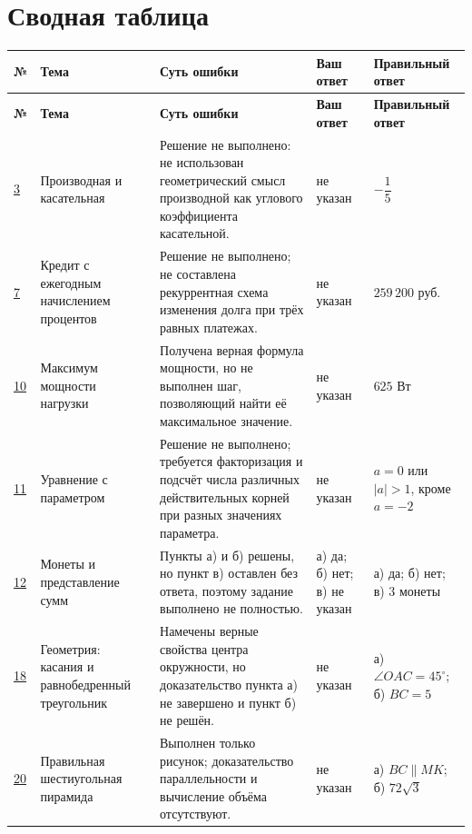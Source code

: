 \documentclass[12pt,a4paper]{article}
\begin{document}
\section*{Сводная таблица}
\small
\setlength{\tabcolsep}{3pt}
\begin{longtable}{>{\centering\arraybackslash}p{0.8cm} p{2.1cm} p{4.5cm} p{2.5cm} p{3.8cm}}
\toprule
\textbf{№} & \textbf{Тема} & \textbf{Суть ошибки} & \textbf{Ваш ответ} & \textbf{Правильный ответ} \\
\midrule
\endfirsthead
\toprule
\textbf{№} & \textbf{Тема} & \textbf{Суть ошибки} & \textbf{Ваш ответ} & \textbf{Правильный ответ} \\
\midrule
\endhead
\bottomrule
\endfoot

\hyperref[task:3]{3} &
Производная и касательная &
Решение не выполнено: не использован геометрический смысл производной как углового коэффициента касательной. &
не указан &
$-\dfrac15$ \\

\hyperref[task:7]{7} &
Кредит с ежегодным начислением процентов &
Решение не выполнено; не составлена рекуррентная схема изменения долга при трёх равных платежах. &
не указан &
$259\,200$ руб. \\

\hyperref[task:10]{10} &
Максимум мощности нагрузки &
Получена верная формула мощности, но не выполнен шаг, позволяющий найти её максимальное значение. &
не указан &
$625$ Вт \\

\hyperref[task:11]{11} &
Уравнение с параметром &
Решение не выполнено; требуется факторизация и подсчёт числа различных действительных корней при разных значениях параметра. &
не указан &
$a=0$ или $|a|>1$, кроме $a=-2$ \\

\hyperref[task:12]{12} &
Монеты и представление сумм &
Пункты а) и б) решены, но пункт в) оставлен без ответа, поэтому задание выполнено не полностью. &
а) да; б) нет; в) не указан &
а) да; б) нет; в) $3$ монеты \\

\hyperref[task:18]{18} &
Геометрия: касания и равнобедренный треугольник &
Намечены верные свойства центра окружности, но доказательство пункта а) не завершено и пункт б) не решён. &
не указан &
а) $\angle OAC=45^\circ$; б) $BC=5$ \\

\hyperref[task:20]{20} &
Правильная шестиугольная пирамида &
Выполнен только рисунок; доказательство параллельности и вычисление объёма отсутствуют. &
не указан &
а) $BC\parallel MK$; б) $72\sqrt3$ \\

\end{longtable}
\normalsize
\end{document}
